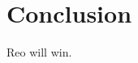 \documentclass[a4paper]{article}
\newcommand{\re}{Reo\xspace}
\begin{document}

\section{Conclusion}

\re will win. 
\end{document}

